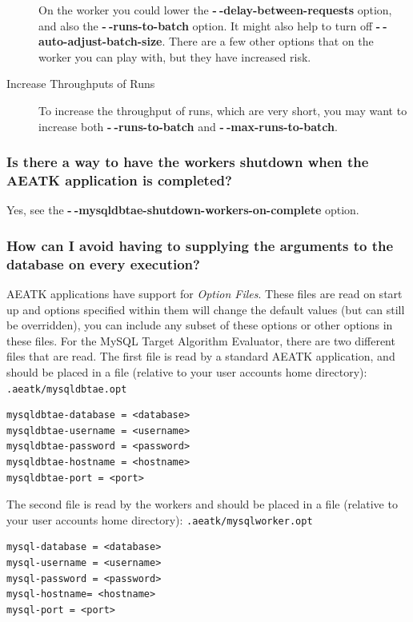 \documentclass[11pt,letterpaper,oneside]{article}
\begin{document}
\begin{description}
On the worker you could lower the \textbf{-$~\!$-delay-between-requests} option, and also the \textbf{-$~\!$-runs-to-batch} option. It might also help to turn off \textbf{-$~\!$-auto-adjust-batch-size}. There are a few other options that on the worker you can play with, but they have increased risk.

\item[Increase Throughputs of Runs] To increase the throughput of runs, which are very short, you may want to increase both \textbf{-$~\!$-runs-to-batch} and \textbf{-$~\!$-max-runs-to-batch}.

\end{description}

\subsubsection{Is there a way to have the workers shutdown when the AEATK application is completed?}

Yes, see the \textbf{-$~\!$-mysqldbtae-shutdown-workers-on-complete} option.


\subsubsection{How can I avoid having to supplying the arguments to the database on every execution?}
\label{faq:optionFiles}

AEATK applications have support for \textit{Option Files}. These files are read on start up and options specified within them will change the default values (but can still be overridden), you can include any subset of these options or other options in these files. For the MySQL Target Algorithm Evaluator, there are two different files that are read. The first file is read by a standard AEATK application, and should be placed in a file (relative to your user accounts home directory): \texttt{.aeatk/mysqldbtae.opt}

\begin{verbatim}
mysqldbtae-database = <database>
mysqldbtae-username = <username>
mysqldbtae-password = <password>
mysqldbtae-hostname = <hostname>
mysqldbtae-port = <port>
\end{verbatim}

The second file is read by the workers and should be placed in a file (relative to your user accounts home directory):  \texttt{.aeatk/mysqlworker.opt}

\begin{verbatim}
mysql-database = <database>
mysql-username = <username>
mysql-password = <password>
mysql-hostname= <hostname>
mysql-port = <port>
\end{verbatim}
\end{document}
